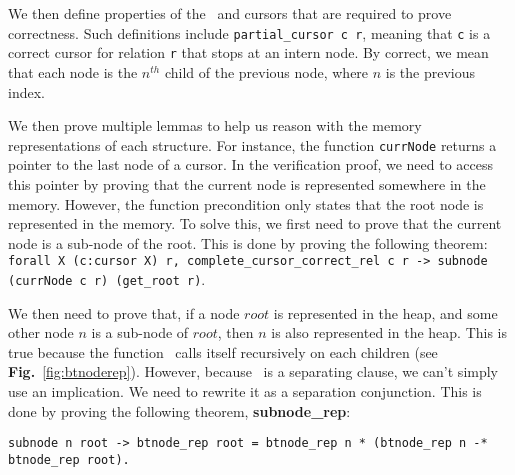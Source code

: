 We then define properties of the \btrees\ and cursors that are required to prove correctness.
Such definitions include \texttt{partial\_cursor c r}, meaning that \texttt{c} is a correct cursor for relation \texttt{r} that stops at an intern node.
By correct, we mean that each node is the $n^{th}$ child of the previous node, where $n$ is the previous index.

We then prove multiple lemmas to help us reason with the memory representations of each structure.
For instance, the function \texttt{currNode} returns a pointer to the last node of a cursor.
In the verification proof, we need to access this pointer by proving that the current node is represented somewhere in the memory.
However, the function precondition only states that the root node is represented in the memory.
To solve this, we first need to prove that the current node is a sub-node of the root.
This is done by proving the following theorem:
\lstinline{forall X (c:cursor X) r, complete_cursor_correct_rel c r -> subnode (currNode c r) (get_root r)}.

We then need to prove that, if a node $root$ is represented in the heap, and some other node $n$ is a sub-node of $root$, then $n$ is also represented in the heap.
This is true because the function \btrep\ calls itself recursively on each children (see \textbf{Fig.}~\ref{fig:btnoderep}).
However, because \btrep\ is a separating clause, we can't simply use an implication. We need to rewrite it as a separation conjunction.
This is done by proving the following theorem, \textbf{subnode\_rep}:

\lstinline{subnode n root -> btnode_rep root = btnode_rep n * (btnode_rep n -* btnode_rep root).}



